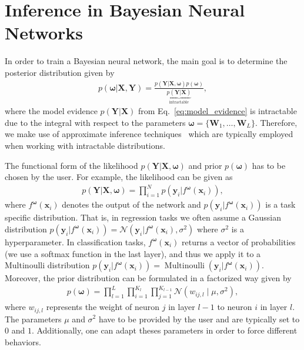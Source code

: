 \documentclass[runningheads]{llncs}
\begin{document}
\section{Inference in Bayesian Neural Networks}
\label{sec:inference_in_bnn}
In order to train a Bayesian neural network, the main goal is to determine the posterior distribution given by
\begin{align*}
    p\left(\boldsymbol{\omega} | \mathbf{X}, \mathbf{Y} \right) = \frac{p(\mathbf{Y} | \mathbf{X}, \boldsymbol{\omega})p\left(\boldsymbol{\omega}\right)}{\underbrace{p\left(\mathbf{Y} | \mathbf{X}\right)}_{\text{intractable}}},
\end{align*}
where the model evidence $p(\mathbf{Y}|\mathbf{X})$ from  Eq.~\ref{eq:model_evidence} is intractable due to the integral with respect to the parameters $\boldsymbol{\omega} = \{\mathbf{W}_1, \ldots,\mathbf{W}_L\}$.
Therefore, we make use of approximate inference techniques~\cite{Gal2016Uncertainty} which are typically employed when working with intractable distributions. 

The functional form of the likelihood $p(\mathbf{Y} | \mathbf{X}, \boldsymbol{\omega})$ and prior $p\left(\boldsymbol{\omega}\right)$ has to be chosen by the user.
For example, the likelihood can be given as
\begin{align}
    p(\mathbf{Y} | \mathbf{X}, \boldsymbol{\omega}) = \prod_{i=1}^N p\left(\mathbf{y}_i | f^{\boldsymbol{\omega}}(\mathbf{x}_i) \right),
\end{align}
where $f^{\boldsymbol{\omega}}(\mathbf{x}_i)$ denotes the output of the network and $p\left(\mathbf{y}_i|f^{\boldsymbol{\omega}}(\mathbf{x}_i)\right)$ is a task specific distribution.
That is, in regression tasks we often assume a Gaussian distribution $p\left(\mathbf{y}_i|f^{\boldsymbol{\omega}}(\mathbf{x}_i)\right) = \mathcal{N}\left(\mathbf{y}_i | f^{\boldsymbol{\omega}}(\mathbf{x}_i) , \sigma^2 \right)$ where $\sigma^2$ is a hyperparameter.
In classification tasks, $f^{\boldsymbol{\omega}}(\mathbf{x}_i)$ returns a vector of probabilities (we use a softmax function in the last layer), and thus we apply it to a Multinoulli distribution $p\left(\mathbf{y}_i|f^{\boldsymbol{\omega}}(\mathbf{x}_i)\right) = \operatorname{Multinoulli}(\mathbf{y}_i |f^{\boldsymbol{\omega}}(\mathbf{x}_i))$.
Moreover, the prior distribution can be formulated in a factorized way given by
\begin{align}
    p\left(\boldsymbol{\omega}\right)=\prod_{l = 1}^{L}\prod_{i=1}^{K_{l}}\prod_{j=1}^{K_{l-1}} \mathcal{N} \left(w_{ij, l} \mid \mu, \sigma^2\right), \label{eq:prior_factorized}
\end{align}
where $w_{ij,l}$ represents the weight of neuron $j$ in layer $l-1$ to neuron $i$ in layer $l$. The parameters $\mu$ and $\sigma^2$ have to be provided by the user and are typically set to $0$ and $1$.
Additionally, one can adapt theses parameters in order to force different behaviors. 
\end{document}
